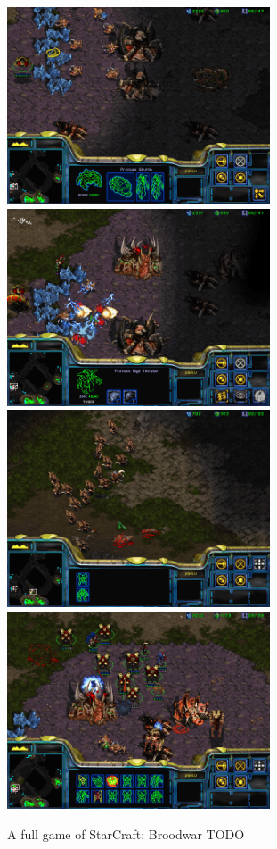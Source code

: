 \begin{figure}[!ht]
\begin{center}
\includegraphics[width=7.8cm]{images/SC_game/SC_drop2a.png}
\includegraphics[width=7.8cm]{images/SC_game/SC_drop2b.png}
\includegraphics[width=7.8cm]{images/SC_game/SC_dt_army.png}
\includegraphics[width=7.8cm]{images/SC_game/SC_final_attack.png}
\label{fig:SC_game2}
\caption{A full game of StarCraft: Broodwar TODO}
\end{center}
\end{figure}

